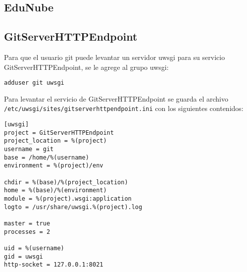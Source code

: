 
\subsection{EduNube}

\subsection{GitServerHTTPEndpoint}
Para que el usuario git puede levantar un servidor uwsgi para su servicio GitServerHTTPEndpoint, se le agrege al grupo uwsgi:
\begin{lstlisting}
adduser git uwsgi
\end{lstlisting}

Para levantar el servicio de GitServerHTTPEndpoint se guarda el archivo \\ \texttt{/etc/uwsgi/sites/gitserverhttpendpoint.ini} con los siguientes contenidos:
\begin{lstlisting}
[uwsgi]
project = GitServerHTTPEndpoint
project_location = %(project)
username = git
base = /home/%(username)
environment = %(project)/env

chdir = %(base)/%(project_location)
home = %(base)/%(environment)
module = %(project).wsgi:application
logto = /usr/share/uwsgi.%(project).log

master = true
processes = 2

uid = %(username)
gid = uwsgi
http-socket = 127.0.0.1:8021
\end{lstlisting}

